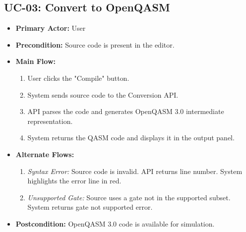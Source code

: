 \subsection{UC-03: Convert to OpenQASM}
\begin{itemize}
    \item \textbf{Primary Actor:} User
    \item \textbf{Precondition:} Source code is present in the editor.
    \item \textbf{Main Flow:}
    \begin{enumerate}
        \item User clicks the "Compile" button.
        \item System sends source code to the Conversion API.
        \item API parses the code and generates OpenQASM 3.0 intermediate representation.
        \item System returns the QASM code and displays it in the output panel.
    \end{enumerate}
    \item \textbf{Alternate Flows:}
    \begin{enumerate}
        \item [3a] \textit{Syntax Error:} Source code is invalid. API returns line number. System highlights the error line in red.
        \item [3b] \textit{Unsupported Gate:} Source uses a gate not in the supported subset. System returns gate not supported error.
    \end{enumerate}
    \item \textbf{Postcondition:} OpenQASM 3.0 code is available for simulation.
\end{itemize}

